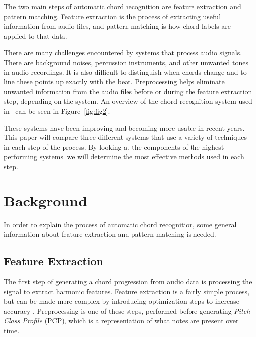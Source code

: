 \documentclass{sig-alternate}
\begin{document}
The two main steps of automatic chord recognition are feature extraction and pattern matching. Feature extraction is the process of extracting useful information from audio files, and pattern matching is how chord labels are applied to that data. 

There are many challenges encountered by systems that process audio signals. There are background noises, percussion instruments, and other unwanted tones in audio recordings. It is also difficult to distinguish when chords change and to line these points up exactly with the beat. Preprocessing helps eliminate unwanted information from the audio files before or during the feature extraction step, depending on the system. An overview of the chord recognition system used in~\cite{Morman:2006} can be seen in Figure~\ref{fig:fig2}.

These systems have been improving and becoming more usable in recent years. This paper will compare three different systems that use a variety of techniques in each step of the process. By looking at the components of the highest performing systems, we will determine the most effective methods used in each step. 

\begin{figure*}
\centering
{}
\caption{Overview of the chord recognition system used in research case 1~\cite{Morman:2006}.}
\label{fig:fig2}
\end{figure*}  

\section{Background}
In order to explain the process of automatic chord recognition, some general information about feature extraction and pattern matching is needed.

\subsection{Feature Extraction}

The first step of generating a chord progression from audio data is processing the signal to extract harmonic features. Feature extraction is a fairly simple process, but can be made more complex by introducing optimization steps to increase accuracy \cite{McVicar:2014}. Preprocessing is one of these steps, performed before generating \textit{Pitch Class Profile} (PCP), which is a representation of what notes are present over time.
\end{document}
